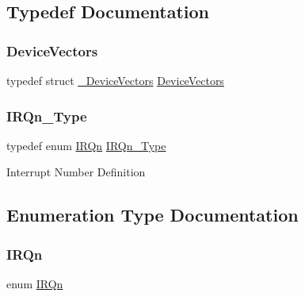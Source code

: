 \subsection{Typedef Documentation}
\mbox{\label{group___s_a_m_d21_g17_a__cmsis_gab68dc58361a6bbb8db7664200fc9cdda}} 
\subsubsection{\texorpdfstring{DeviceVectors}{DeviceVectors}}
{\footnotesize\ttfamily typedef struct \mbox{\hyperlink{struct___device_vectors}{\+\_\+\+Device\+Vectors}}  \mbox{\hyperlink{group___s_a_m_d21_e15_a__cmsis_gab68dc58361a6bbb8db7664200fc9cdda}{Device\+Vectors}}}

\mbox{\label{group___s_a_m_d21_g17_a__cmsis_gac3af4a32370fb28c4ade8bf2add80251}} 
\subsubsection{\texorpdfstring{IRQn\_Type}{IRQn\_Type}}
{\footnotesize\ttfamily typedef enum \mbox{\hyperlink{group___s_a_m_d21_e15_a__cmsis_ga666eb0caeb12ec0e281415592ae89083}{I\+R\+Qn}}  \mbox{\hyperlink{group___s_a_m_d21_e15_a__cmsis_gac3af4a32370fb28c4ade8bf2add80251}{I\+R\+Qn\+\_\+\+Type}}}

Interrupt Number Definition 

\subsection{Enumeration Type Documentation}
\mbox{\label{group___s_a_m_d21_g17_a__cmsis_ga666eb0caeb12ec0e281415592ae89083}} 
\subsubsection{\texorpdfstring{IRQn}{IRQn}}
{\footnotesize\ttfamily enum \mbox{\hyperlink{group___s_a_m_d21_e15_a__cmsis_ga666eb0caeb12ec0e281415592ae89083}{I\+R\+Qn}}}

